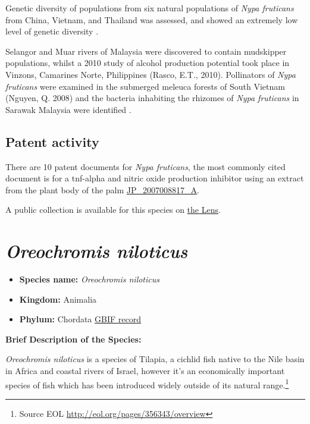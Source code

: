\documentclass[]{book}
\providecommand{\tightlist}{%
  \setlength{\itemsep}{0pt}\setlength{\parskip}{0pt}}
\theoremstyle{definition}
\theoremstyle{definition}
\theoremstyle{definition}
\theoremstyle{remark}
\begin{document}
Genetic diversity of populations from six natural populations of
\emph{Nypa fruticans} from China, Vietnam, and Thailand was assessed,
and showed an extremely low level of genetic diversity
\citep{Jian_2010}.

Selangor and Muar rivers of Malaysia were discovered to contain
mudskipper populations, whilst a 2010 study of alcohol production
potential took place in Vinzons, Camarines Norte, Philippines (Rasco,
E.T., 2010). Pollinators of \emph{Nypa fruticans} were examined in the
submerged meleuca forests of South Vietnam (Nguyen, Q. 2008) and the
bacteria inhabiting the rhizomes of \emph{Nypa fruticans} in Sarawak
Malaysia were identified \citep{Tang_2010}.

\hypertarget{patent-activity-4}{%
\subsection{Patent activity}\label{patent-activity-4}}

There are 10 patent documents for \emph{Nypa fruticans}, the most
commonly cited document is for a tnf-alpha and nitric oxide production
inhibitor using an extract from the plant body of the palm
\href{https://www.lens.org/lens/patent/JP_2007008817_A}{JP\_2007008817\_A}.

A public collection is available for this species on
\href{https://www.lens.org/lens/collection/24939}{the Lens}.

\hypertarget{oreochromis-niloticus}{%
\section{\texorpdfstring{\emph{Oreochromis
niloticus}}{Oreochromis niloticus}}\label{oreochromis-niloticus}}

\begin{itemize}
\tightlist
\item
  \textbf{Species name:} \emph{Oreochromis niloticus}
\item
  \textbf{Kingdom:} Animalia\\
\item
  \textbf{Phylum:} Chordata
  \href{https://www.gbif.org/species/4285694}{GBIF record}
\end{itemize}

\textbf{Brief Description of the Species:}

\emph{Oreochromis niloticus} is a species of Tilapia, a cichlid fish
native to the Nile basin in Africa and coastal rivers of Israel, however
it's an economically important species of fish which has been introduced
widely outside of its natural range.\footnote{Source EOL
  \url{http://eol.org/pages/356343/overview}}
\end{document}

